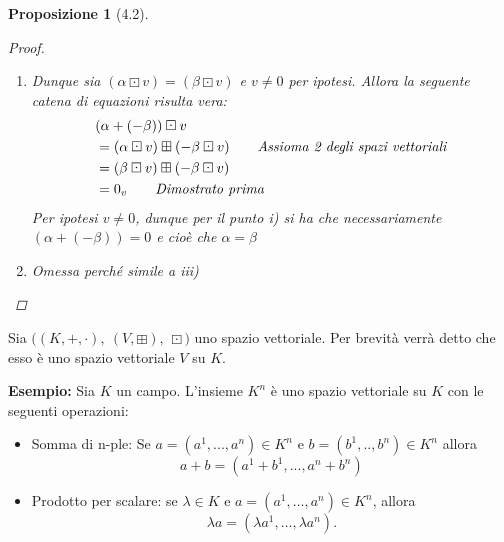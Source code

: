 \documentclass[11pt,a4paper]{article}
\theoremstyle{manuale}
\newtheorem*{proposizione}{Proposizione}
\theoremstyle{manualecorsivo}
\newcommand{\motivo}[1]{\tag*{\textit{#1}}}
\begin{document}
\begin{proposizione}[4.2]
\begin{proof}
\begin{enumerate}[label=\roman*)]
\begin{itemize}
					\item Dimostriamo che l'inverso di  $(\alpha \boxdot v)$ è $\alpha \boxdot (-v)$ in $(V, \boxplus)$ \\
					\begin{align*}
						& (\alpha \boxdot v) \boxplus \boldsymbol{(\alpha \boxdot (-v))}  \\
						& = \alpha \boxdot (v \boxplus (-v)) \motivo{Assioma 3 degli spazi vettoriali} \\
						& = \alpha \boxdot 0_v \motivo{Dimostrato prima} \\
						& = 0_v
					\end{align*}
				\end{itemize}
				
				\item Dunque sia $(\alpha \boxdot v) = (\beta \boxdot v)$ e $v \neq 0$ per ipotesi. Allora la seguente catena di equazioni risulta vera:
				\begin{align*}
					& (\alpha + (- \beta)) \boxdot v \\
					& = (\alpha \boxdot v) \boxplus (- \beta \boxdot v) \motivo{Assioma 2 degli spazi vettoriali} \\
					& = (\beta \boxdot v) \boxplus (- \beta \boxdot v) \\
					& = 0_v \motivo{Dimostrato prima}
				\end{align*}
				Per ipotesi $v \neq 0$, dunque per il punto \textit{i)} si ha che necessariamente $(\alpha + (- \beta)) =  0$ e cioè che $\alpha = \beta$
			
				\item Omessa perché simile a \textit{iii)}
			
			\end{enumerate}
		\end{proof}
	\end{proposizione}
	
	Sia $\big((K,+,\cdot),\ (V,\boxplus),\ \boxdot\big)$ uno spazio vettoriale. Per brevità verrà detto che esso è uno spazio vettoriale $V$ su $K$.
	
	\textbf{Esempio:} Sia $K$ un campo. L'insieme $K^n$ è uno spazio vettoriale su $K$ con le seguenti operazioni:
	\begin{itemize}
		\item Somma di n-ple: Se $a = (a^1,...,a^n) \in K^n$ e $b = (b^1,..,b^n) \in K^n$ allora $$a+b = (a^1 + b^1,...,a^n+b^n)$$
		\item Prodotto per scalare: se $\lambda \in K$ e $a = (a^1,\dots,a^n) \in K^n$, allora \[ \lambda a = (\lambda a^1,\dots,\lambda a^n). \]
	\end{itemize}
	
\end{document}
